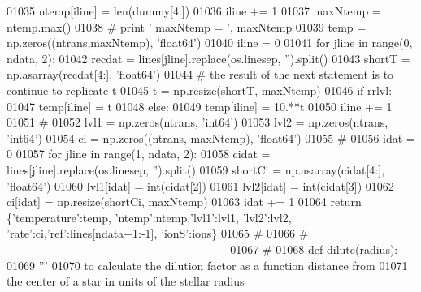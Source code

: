 \begin{DoxyCode}
{{{{{{{{{{{{01035         ntemp[iline] = len(dummy[4:])
01036         iline += 1
01037     maxNtemp = ntemp.max()
01038 \textcolor{comment}{#   print ' maxNtemp = ', maxNtemp}
01039     temp = np.zeros((ntrans,maxNtemp), \textcolor{stringliteral}{'float64'})
01040     iline = 0
01041     \textcolor{keywordflow}{for} jline \textcolor{keywordflow}{in} range(0, ndata, 2):
01042         recdat = lines[jline].replace(os.linesep, \textcolor{stringliteral}{''}).split()
01043         shortT = np.asarray(recdat[4:], \textcolor{stringliteral}{'float64'})
01044         \textcolor{comment}{# the result of the next statement is to continue to replicate t}
01045         t = np.resize(shortT, maxNtemp)
01046         \textcolor{keywordflow}{if} rrlvl:
01047             temp[iline] = t
01048         \textcolor{keywordflow}{else}:
01049             temp[iline] = 10.**t
01050         iline += 1
01051     \textcolor{comment}{#}
01052     lvl1 = np.zeros(ntrans, \textcolor{stringliteral}{'int64'})
01053     lvl2 = np.zeros(ntrans, \textcolor{stringliteral}{'int64'})
01054     ci = np.zeros((ntrans, maxNtemp), \textcolor{stringliteral}{'float64'})
01055     \textcolor{comment}{#}
01056     idat = 0
01057     \textcolor{keywordflow}{for} jline \textcolor{keywordflow}{in} range(1, ndata, 2):
01058         cidat = lines[jline].replace(os.linesep, \textcolor{stringliteral}{''}).split()
01059         shortCi = np.asarray(cidat[4:], \textcolor{stringliteral}{'float64'})
01060         lvl1[idat] = int(cidat[2])
01061         lvl2[idat] = int(cidat[3])
01062         ci[idat] = np.resize(shortCi, maxNtemp)
01063         idat += 1
01064     \textcolor{keywordflow}{return} \{\textcolor{stringliteral}{'temperature'}:temp, \textcolor{stringliteral}{'ntemp'}:ntemp,\textcolor{stringliteral}{'lvl1'}:lvl1, \textcolor{stringliteral}{'lvl2'}:lvl2, \textcolor{stringliteral}{'rate'}:ci,\textcolor{stringliteral}{'ref'}:lines[ndata+1:-1], \textcolor{stringliteral}{
      'ionS'}:ions\}
01065     \textcolor{comment}{#}
01066     \textcolor{comment}{# ----------------------------------------------------------}
01067     \textcolor{comment}{#}
\hypertarget{__chianti__tools_8py_source_l01068}{}\hyperlink{namespacepyneb_1_1utils_1_1__chianti__tools_a5d55ad976e899b30719ac9b053e34ceb}{01068} \textcolor{keyword}{def }\hyperlink{namespacepyneb_1_1utils_1_1__chianti__tools_a5d55ad976e899b30719ac9b053e34ceb}{dilute}(radius):
01069     \textcolor{stringliteral}{'''}
01070 \textcolor{stringliteral}{    to calculate the dilution factor as a function distance from}
01071 \textcolor{stringliteral}{    the center of a star in units of the stellar radius}
}}}}}}}}}}}}
\end{DoxyCode}

